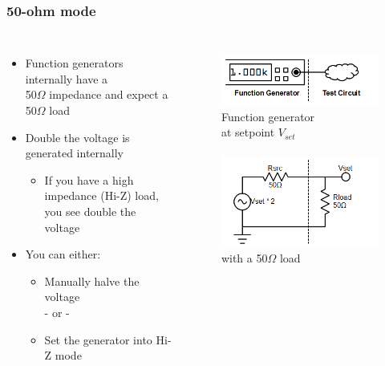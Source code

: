\documentclass{beamer}
\begin{document}
\begin{frame}
\frametitle{50-ohm mode}
\begin{columns}[t]
\begin{itemize}
  \item Function generators internally have a \\
  50$\Omega$ impedance and expect a 50$\Omega$ load
  \item Double the voltage is generated internally
  \begin{itemize}
    \item If you have a high impedance (Hi-Z) load, you see double the voltage
  \end{itemize}
  \item You can either:
  \begin{itemize}
    \item Manually halve the voltage \\
     - or -
    \item Set the generator into Hi-Z mode
  \end{itemize}
\end{itemize}

\centering
\begin{figure}
  \centering
  \includegraphics[width=0.75\columnwidth]{images-dis2/funcgen-header} \newline
  Function generator \\
  at setpoint $V_{set}$ \\
  \hfill \\
  \includegraphics[width=0.75\columnwidth]{images-dis2/funcgen-50ohm} \newline
  with a 50$\Omega$ load
  

\end{figure}
\end{columns}
\end{frame}
\end{document}
